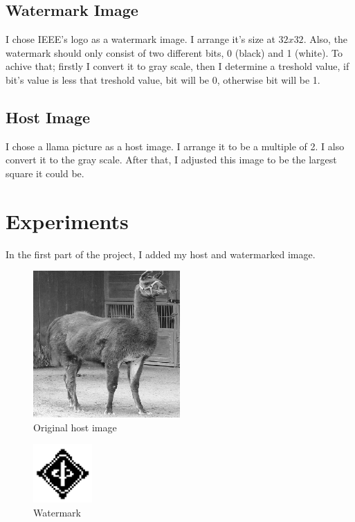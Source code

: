 \documentclass[conference]{IEEEtran}
\begin{document}
\subsection{Watermark Image}
I chose IEEE's logo as a watermark image. I arrange it's size at $32x32$. Also, the watermark should only consist of two different bits, 0 (black) and 1 (white). To achive that; firstly I convert it to gray scale, then I determine a treshold value, if bit's value is less that treshold value, bit will be 0, otherwise bit will be 1.
\subsection{Host Image}
I chose a llama picture as a host image. I arrange it to be a multiple of 2. I also convert it to the gray scale. After that, I adjusted this image to be the largest square it could be.

\vspace{30pt}
\section{Experiments}

In the first part of the project, I added my host and watermarked image.

\begin{figure}[h]
    \centering
    \includegraphics[width=0.5\textwidth, angle=0]{images/output_host_image.png}
    \caption{Original host image}
    \label{fig1}
\end{figure}


\begin{figure}[h]
    \centering
    \includegraphics[width=0.2\textwidth, angle=0]{images/output_watermark.png}
    \caption{Watermark}
    \label{fig2}
\end{figure}
\end{document}
